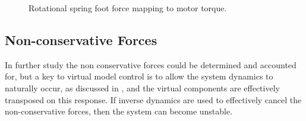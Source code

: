 \begin{figure}
\centering
{}

\caption{Rotational spring foot force mapping to motor torque.}
\label{fig:Rotational spring foot force mapping to motor torque}
\end{figure}

\subsection{Non-conservative Forces}

In further study the non conservative forces could be determined and accounted for, but a key to virtual model control is to allow the system dynamics to naturally occur, as discussed in \cite{Pratt2001}, and the virtual components are effectively transposed on this response. If inverse dynamics are used to effectively cancel the non-conservative forces, then the system can become unstable. 

